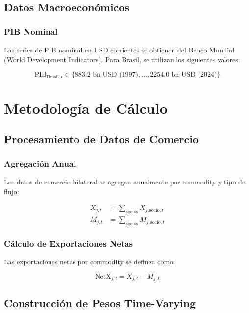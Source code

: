 \documentclass[12pt,a4paper]{article}
\begin{document}
\subsection{Datos Macroeconómicos}

\subsubsection{PIB Nominal}
Las series de PIB nominal en USD corrientes se obtienen del Banco Mundial (World Development Indicators). Para Brasil, se utilizan los siguientes valores:

\begin{equation}
\text{PIB}_{\text{Brasil},t} \in \{883.2 \text{ bn USD (1997)}, \ldots, 2254.0 \text{ bn USD (2024)}\}
\label{eq:gdp_brazil}
\end{equation}

\section{Metodología de Cálculo}

\subsection{Procesamiento de Datos de Comercio}

\subsubsection{Agregación Anual}
Los datos de comercio bilateral se agregan anualmente por commodity y tipo de flujo:

\begin{align}
X_{j,t} &= \sum_{\text{socios}} X_{j,\text{socio},t} \label{eq:exports_agg} \\
M_{j,t} &= \sum_{\text{socios}} M_{j,\text{socio},t} \label{eq:imports_agg}
\end{align}

\subsubsection{Cálculo de Exportaciones Netas}
Las exportaciones netas por commodity se definen como:

\begin{equation}
\text{NetX}_{j,t} = X_{j,t} - M_{j,t}
\label{eq:net_exports}
\end{equation}

\subsection{Construcción de Pesos Time-Varying}
\end{document}
